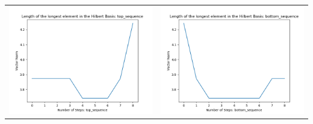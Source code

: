 \documentclass[10pt]{article}
\begin{document}
\begin{tabular}{c|c}
\begin{minipage}{.45\textwidth}
\includegraphics[width=\textwidth]{"DATA/4d/4 generators 2 bound B/top_sequence LENGTH"}
\end{minipage} &
\begin{minipage}{.45\textwidth}
\includegraphics[width=\textwidth]{"DATA/4d/4 generators 2 bound B bottomup/bottom_sequence LENGTH"}
\end{minipage}
\end{tabular}
\end{document}
